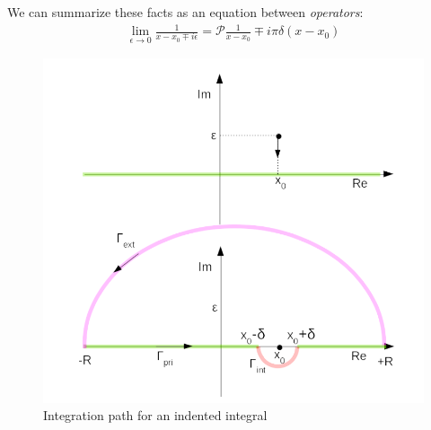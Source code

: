 \documentclass[../template.tex]{subfiles}
\begin{document}
We can summarize these facts as an equation between \textit{operators}:
\begin{align*}
    \lim_{\epsilon \to 0} \frac{1}{x - x_0 \mp i \epsilon} = \mathcal{P}\frac{1}{x - x_0} \mp i \pi \delta(x-x_0)  
\end{align*} 

\begin{figure}[h!]
    \centering
    \includegraphics{image003.png}
    \caption{Integration path for an indented integral\label{fig:indented1}}
\end{figure}

 
\end{document}

